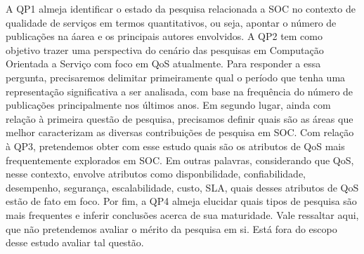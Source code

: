 A QP1 almeja identificar o estado da pesquisa relacionada a SOC no contexto de qualidade de servi\c{c}os em termos quantitativos, ou seja, apontar o n\'{u}mero de publica\c{c}\~{o}es na \'{a}area e os principais autores envolvidos. A QP2 tem como objetivo trazer uma perspectiva do cen\'{a}rio das pesquisas em Computa\c{c}\~{a}o Orientada a Servi\c{c}o com foco em QoS atualmente. Para responder a essa pergunta, precisaremos delimitar primeiramente qual o per\'{i}odo que tenha uma representa\c{c}\~{a}o significativa a ser analisada, com base na frequ\^{e}ncia do n\'{u}mero de publica\c{c}\~{o}es principalmente nos \'{u}ltimos anos. Em segundo lugar, ainda com rela\c{c}\~{a}o \`{a} primeira quest\~{a}o de pesquisa, precisamos definir quais s\~{a}o as \'{a}reas que melhor caracterizam as diversas contribui\c{c}\~{o}es de pesquisa em SOC. Com rela\c{c}\~{a}o \`{a} QP3, pretendemos obter com esse estudo quais s\~{a}o os atributos de QoS mais frequentemente explorados em SOC. Em outras palavras, considerando que QoS, nesse contexto, envolve atributos como disponbilidade, confiabilidade, desempenho, seguran\c{c}a, escalabilidade, custo, SLA, quais desses atributos de QoS est\~{a}o de fato em foco. Por fim, a QP4 almeja elucidar quais tipos de pesquisa s\~{a}o mais frequentes e inferir conclusões acerca de sua maturidade. Vale ressaltar aqui, que n\~{a}o pretendemos avaliar o m\'{e}rito da pesquisa em si. Est\'{a} fora do escopo desse estudo avaliar tal quest\~{a}o.


